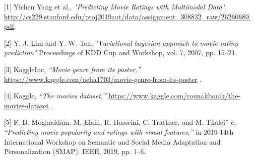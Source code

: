 \documentclass{article}
\begin{document}
[1] Yichen Yang et al., {\it "Predicting Movie Ratings with Multimodal Data"},
\url{http://cs229.stanford.edu/proj2019aut/data/assignment_308832_raw/26260680.pdf}.

[2] Y. J. Lim and Y. W. Teh, {\it "Variational bayesian approach to movie rating prediction"}  Proceedings of KDD Cup and Workshop, vol. 7, 2007, pp. 15–21.

[3] KaggleInc, {\it “Movie genre from its poster,”} 
\url{https://www.kaggle.com/neha1703/movie-genre-from-its-poster} .

[4] Kaggle, {\it “The movies dataset,” } \url{https://www.kaggle.com/rounakbanik/the-movies-dataset} .

[5] F. B. Moghaddam, M. Elahi, R. Hosseini, C. Trattner, and M. Tkalciˇ c, {\it“Predicting movie popularity and ratings with visual features,” } in 2019 14th International Workshop on Semantic and Social Media Adaptation and Personalization (SMAP). IEEE, 2019, pp. 1–6.
\end{document}
